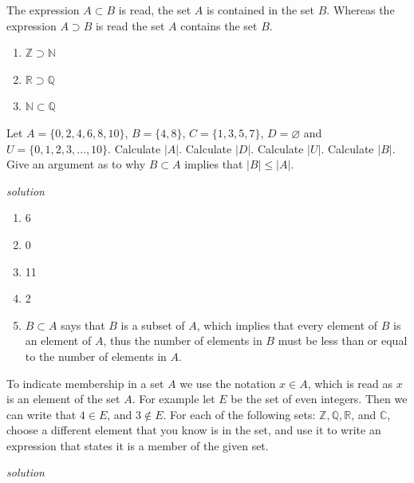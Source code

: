 \documentclass{amsbook}
\begin{document}
\begin{Answer}[ref={s1}]
    The expression $A \subset B$ is read, the set $A$ is contained in the set $B$. Whereas the expression $A \supset B$ is read the set $A$ contains the set $B$.
    \begin{enumerate}
        \item $\mathbb{Z}\supset \mathbb{N}$
        \item $\mathbb{R}\supset \mathbb{Q}$
        \item $\mathbb{N} \subset \mathbb{Q}$
    \end{enumerate}
\end{Answer}

\begin{Exercise}[title={The cardinality of a set}, difficulty=0, label=s2]
Let $A=\{0,2,4,6,8, 10\}$, $B=\{4,8\}$, $C=\{1,3,5,7\}$, $D=\varnothing$ and $U=\{0,1,2,3,\ldots ,10\}$.
    \Question Calculate $|A|$.
    \Question Calculate $|D|$.
    \Question Calculate $|U|$.
    \Question Calculate $|B|$.
    \Question Give an argument as to why $B \subset A$ implies that $|B| \leq |A|$.
    
    \hfill \emph{solution}  
\end{Exercise}

\begin{Answer}[ref={s2}]
    \begin{enumerate}
        \item 6
        \item 0
        \item 11
        \item 2
        \item $B \subset A$ says that $B$ is a subset of $A$, which implies that every element of $B$ is an element of $A$, thus the number of elements in $B$ must be less than or equal to the number of elements in $A$.
    \end{enumerate}
\end{Answer}

\begin{Exercise}[title={Looking for an Element}, difficulty=0, label=s3]
    To indicate membership in a set $A$ we use the notation $x \in A$, which is read as $x$ is an element of the set $A$. For example let $E$ be the set of even integers. Then we can write that $4 \in E$, and $3 \notin E$. For each of the following sets: $\mathbb{Z}, \mathbb{Q}, \mathbb{R}$, and $\mathbb{C}$, choose a different element that you know is in the set, and use it to write an expression that states it is a member of the given set. 

    \hfill \emph{solution} 
\end{Exercise}
\end{document}
